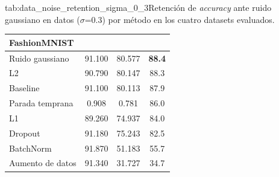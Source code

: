 \begin{table}{tab:data_noise_retention_sigma_0_3}{Retención de \textit{accuracy} ante ruido gaussiano en datos ($\sigma$=0.3) por método en los cuatro datasets evaluados.}
\begin{tabular}{lccc}
\midrule
\multicolumn{4}{l}{\textbf{FashionMNIST}}\\
\midrule
Ruido gaussiano & 91.100 & 80.577 & \textbf{88.4} \\
L2 & 90.790 & 80.147 & 88.3 \\
Baseline & 91.100 & 80.113 & 87.9 \\
Parada temprana & 0.908 & 0.781 & 86.0 \\
L1 & 89.260 & 74.937 & 84.0 \\
Dropout & 91.180 & 75.243 & 82.5 \\
BatchNorm & 91.870 & 51.183 & 55.7 \\
Aumento de datos & 91.340 & 31.727 & 34.7 \\
\bottomrule
\end{tabular}
\end{table}